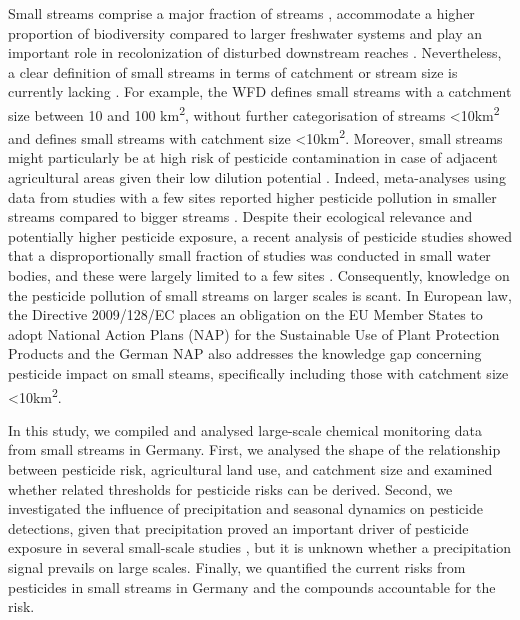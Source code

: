 \documentclass[journal=esthag,manuscript=article]{achemso}
\begin{document}
Small streams comprise a major fraction of streams \citep{nadeau_hydrological_2007}, accommodate a higher proportion of biodiversity compared to larger freshwater systems \citep{davies_comparison_2008, biggs_report_2014} and play an important role in recolonization of disturbed downstream reaches \citep{liess_analyzing_2005, orlinskiy_forested_2015}.
Nevertheless, a clear definition of small streams in terms of catchment or stream size is currently lacking \citep{lorenz_specifics_2016}. 
For example, the WFD defines small streams with a catchment size between 10 and 100 km\textsuperscript{2}, without further categorisation of streams \textless 10km\textsuperscript{2} and \citet{lorenz_specifics_2016} defines small streams with catchment size \textless 10km\textsuperscript{2}. 
Moreover, small streams might particularly be at high risk of pesticide contamination in case of adjacent agricultural areas given their low dilution potential \citep{schulz_field_2004,liess_determination_1999}.
Indeed, meta-analyses using data from studies with a few sites reported higher pesticide pollution in smaller streams compared to bigger streams \citep{stehle_pesticide_2015,schulz_field_2004}. 
Despite their ecological relevance and potentially higher pesticide exposure, a recent analysis of pesticide studies showed that a disproportionally small fraction of studies was conducted in small water bodies, and these were largely limited to a few sites \citep{lorenz_specifics_2016}. 
Consequently, knowledge on the pesticide pollution of small streams on larger scales is scant. 
In European law, the Directive 2009/128/EC \citep{European_Union_2009} places an obligation on the EU Member States to adopt National Action Plans (NAP) for the Sustainable Use of Plant Protection Products and the German NAP also addresses the knowledge gap concerning pesticide impact on small steams, specifically including those with catchment size \textless 10km\textsuperscript{2}.


In this study, we compiled and analysed large-scale chemical monitoring data from small streams in Germany. 
First, we analysed the shape of the relationship between pesticide risk, agricultural land use, and catchment size and examined whether related thresholds for pesticide risks can be derived. 
Second, we investigated the influence of precipitation and seasonal dynamics on pesticide detections, given that precipitation proved an important driver of pesticide exposure in several small-scale studies \citep{wittmer_significance_2010,schulz_field_2004}, but it is unknown whether a precipitation signal prevails on large scales. 
Finally, we quantified the current risks from pesticides in small streams in Germany and the compounds accountable for the risk.
\end{document}
